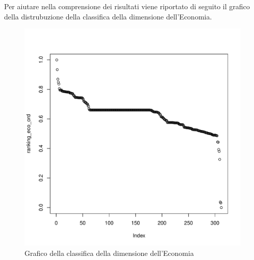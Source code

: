 \documentclass[a4paper,12pt, openright]{report}
\begin{document}
Per aiutare nella comprensione dei risultati viene riportato di seguito il grafico della distrubuzione della classifica della dimensione dell'Economia. 
\begin{figure}[H]
    \centering
    \includegraphics[scale=.5]{ranking_eco_norm.pdf}
    \caption{Grafico della classifica della dimensione dell'Economia}
\end{figure}
\end{document}
